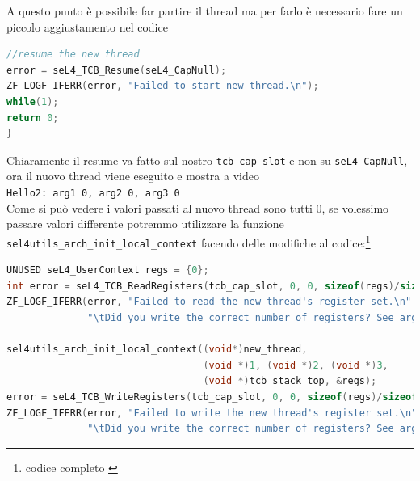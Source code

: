 A questo punto è possibile far partire il thread ma per farlo è necessario fare un piccolo aggiustamento nel codice 
\begin{lstlisting}[language=C++]
//resume the new thread
error = seL4_TCB_Resume(seL4_CapNull);
ZF_LOGF_IFERR(error, "Failed to start new thread.\n");
while(1);
return 0;
}
\end{lstlisting}
Chiaramente il resume va fatto sul nostro \texttt{tcb\_cap\_slot} e non su \texttt{seL4\_CapNull}, ora il nuovo thread viene eseguito e mostra a video\\
\texttt{Hello2: arg1 0, arg2 0, arg3 0}\\
Come si può vedere i valori passati al nuovo thread sono tutti 0, se volessimo passare valori differente potremmo utilizzare la funzione \texttt{sel4utils\_arch\_init\_local\_context} facendo delle modifiche al codice:\footnote{codice completo \cite{threads}}
\begin{lstlisting}[language=C++]
UNUSED seL4_UserContext regs = {0};
int error = seL4_TCB_ReadRegisters(tcb_cap_slot, 0, 0, sizeof(regs)/sizeof(seL4_Word), &regs);
ZF_LOGF_IFERR(error, "Failed to read the new thread's register set.\n"
              "\tDid you write the correct number of registers? See arg4.\n");

sel4utils_arch_init_local_context((void*)new_thread,
                                  (void *)1, (void *)2, (void *)3,
                                  (void *)tcb_stack_top, &regs);
error = seL4_TCB_WriteRegisters(tcb_cap_slot, 0, 0, sizeof(regs)/sizeof(seL4_Word), &regs);
ZF_LOGF_IFERR(error, "Failed to write the new thread's register set.\n"
              "\tDid you write the correct number of registers? See arg4.\n");
\end{lstlisting}

